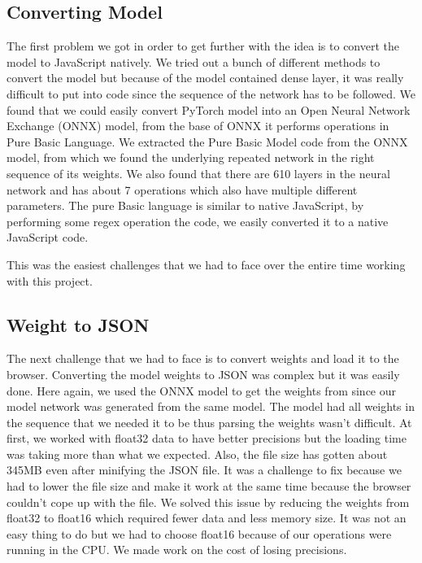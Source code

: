 \documentclass[a4paper,12pt]{article}
\begin{document}
\subsection{Converting Model}
The first problem we got in order to get further with the idea is to convert the model to JavaScript natively. We tried out a bunch of different methods to convert the model but because of the model contained dense layer, it was really difficult to put into code since the sequence of the network has to be followed. We found that we could easily convert PyTorch model into an Open Neural Network Exchange (ONNX) model, from the base of ONNX it performs operations in Pure Basic Language. We extracted the Pure Basic Model code from the ONNX model, from which we found the underlying repeated network in the right sequence of its weights. We also found that there are 610 layers in the neural network and has about 7 operations which also have multiple different parameters. The pure Basic language is similar to native JavaScript, by performing some regex operation the code, we easily converted it to a native JavaScript code. 

This was the easiest challenges that we had to face over the entire time working with this project.

\subsection{Weight to JSON}
The next challenge that we had to face is to convert weights and load it to the browser. Converting the model weights to JSON was complex but it was easily done. Here again, we used the ONNX model to get the weights from since our model network was generated from the same model. The model had all weights in the sequence that we needed it to be thus parsing the weights wasn't difficult. At first, we worked with float32 data to have better precisions but the loading time was taking more than what we expected. Also, the file size has gotten about 345MB even after minifying the JSON file. It was a challenge to fix because we had to lower the file size and make it work at the same time because the browser couldn't cope up with the file. We solved this issue by reducing the weights from float32 to float16 which required fewer data and less memory size. It was not an easy thing to do but we had to choose float16 because of our operations were running in the CPU. We made work on the cost of losing precisions.
\end{document}
